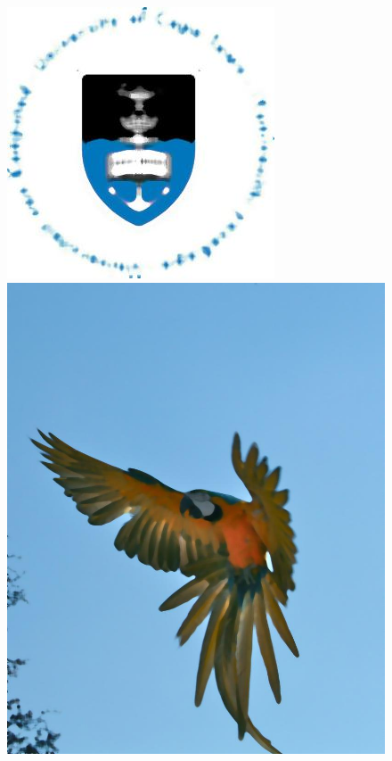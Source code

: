 \begin{figure}[!]
	\centering
	\includegraphics[scale=0.2]{Figures/smallO.jpg}
	\includegraphics[scale=0.07]{Figures/flyO.jpg}

\end{figure}
